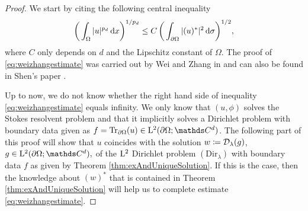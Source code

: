 \begin{proof}
  We start by citing the following central inequality
  \begin{align}
    \label{eq:weizhangestimate}
    \bigg( \int_\Omega |u|^{p_d} \, {\operatorname{d}\!{x}} \bigg)^{1/{p_d}} \leq C\, \bigg( \int_{\partial\Omega} |(u)^*|^2 \, {\operatorname{d}\!{\sigma}} \bigg)^{1/2},
  \end{align}
  where $C$ only depends on $d$ and the Lipschitz constant of $\Omega$.
  The proof of \eqref{eq:weizhangestimate} was carried out by Wei and Zhang in \cite[Lem. 3.3]{weiZhang} and can also be found in Shen's paper \cite[p. 418f.]{Shen2012}.

  Up to now, we do not know whether the right hand side of inequality \eqref{eq:weizhangestimate}  equals infinity.
  We only know that $(u,\phi)$ solves the Stokes resolvent problem and that it implicitly solves a Dirichlet problem with boundary data given as $f = \operatorname{Tr}_{\partial\Omega} (u) \in \Ell^2(\partial\Omega; \C^d)$.
  The following part of this proof will show that $u$ coincides with the solution $w \coloneqq \mathcal{D}_\lambda(g)$, $g \in \Ell^2(\partial\Omega; \C^d),$  of the $\mathrm{L}^2$ Dirichlet problem \hyperref[eq:dirProblem]{$(\mathrm{Dir}_\lambda)$} with boundary data $f$ as given by Theorem \ref{thm:exAndUniqueSolution}. 
  If this is the case, then the knowledge about $(w)^*$ that is contained in Theorem \ref{thm:exAndUniqueSolution} will help us to complete estimate \eqref{eq:weizhangestimate}.


\end{proof}
